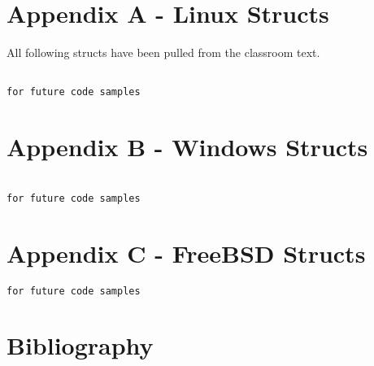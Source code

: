 \clearpage
\section{Appendix A - Linux Structs}
All following structs have been pulled from the classroom text. \cite{robertlove2010}
\begin{lstlisting}

for future code samples

\end{lstlisting}

\section{Appendix B - Windows Structs}
\begin{lstlisting}

for future code samples
\end{lstlisting}
\section{Appendix C - FreeBSD Structs}
\begin{lstlisting}
for future code samples

\end{lstlisting}

\section{Bibliography}
% 
% 
%
% 
